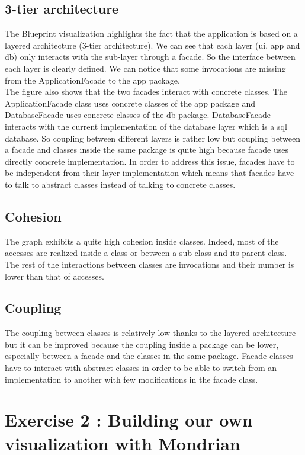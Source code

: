 \documentclass[a4paper,10pt]{article}
\begin{document}
\subsection{3-tier architecture}
The Blueprint visualization highlights the fact that the application is based on a layered architecture (3-tier architecture). We can see that each layer (ui, app and db) only interacts with the sub-layer through a facade. So the interface between each layer is clearly defined. We can notice that some invocations are missing from the ApplicationFacade to the app package.\\
The figure also shows that the two facades interact with concrete classes. The ApplicationFacade class uses concrete classes of the app package and DatabaseFacade uses concrete classes of the db package. DatabaseFacade interacts with the current implementation of the database layer which is a sql database. So coupling between different layers is rather low but coupling between a facade and classes inside the same package is quite high because facade uses directly concrete implementation. In order to address this issue, facades have to be independent from their layer implementation which means that facades have to talk to abstract classes instead of talking to concrete classes.

\subsection{Cohesion}
The graph exhibits a quite high cohesion inside classes. Indeed, most of the accesses are realized inside a class or between a sub-class and its parent class. The rest of the interactions between classes are invocations and their number is lower than that of accesses.

\subsection{Coupling}
The coupling between classes is relatively low thanks to the layered architecture but it can be improved because the coupling inside a package can be lower, especially between a facade and the classes in the same package. Facade classes have to interact with abstract classes in order to be able to switch from an implementation to another with few modifications in the facade class.

\section{Exercise 2 : Building our own visualization with Mondrian}
\end{document}
